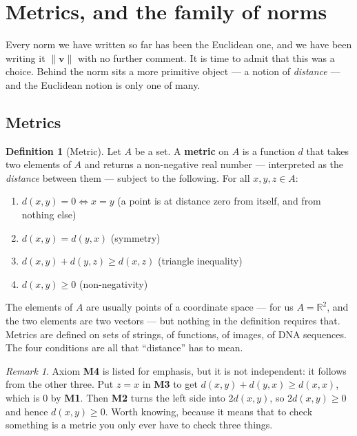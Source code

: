 \documentclass[11pt]{article}
\theoremstyle{definition}
\newtheorem{defn}{Definition}
\theoremstyle{remark}
\newtheorem*{rmk}{Remark}
\newcommand{\R}{\mathbb{R}}
\newcommand{\vc}[1]{\mathbf{#1}}
\newcommand{\norm}[1]{\lVert #1\rVert}
\begin{document}
\section{Metrics, and the family of norms}
Every norm we have written so far has been the Euclidean one, and we have been
writing it $\norm{\vc{v}}$ with no further comment. It is time to admit that
this was a choice. Behind the norm sits a more primitive object --- a notion of
\emph{distance} --- and the Euclidean notion is only one of many.

\subsection{Metrics}
\begin{defn}[Metric]
Let $A$ be a set. A \textbf{metric} on $A$ is a function $d$ that takes two
elements of $A$ and returns a non-negative real number --- interpreted as the
\emph{distance} between them --- subject to the following. For all
$x,y,z\in A$:
\begin{enumerate}[label=\textbf{M\arabic*.},leftmargin=3.0em,itemsep=4pt,
                  topsep=4pt]
  \item $d(x,y)=0 \iff x=y$
        \hfill (a point is at distance zero from itself, and from nothing else)
  \item $d(x,y)=d(y,x)$
        \hfill (symmetry)
  \item $d(x,y)+d(y,z)\ge d(x,z)$
        \hfill (triangle inequality)
  \item $d(x,y)\ge 0$
        \hfill (non-negativity)
\end{enumerate}
\end{defn}

\noindent The elements of $A$ are usually points of a coordinate space --- for
us $A=\R^{2}$, and the two elements are two vectors --- but nothing in the
definition requires that. Metrics are defined on sets of strings, of functions,
of images, of DNA sequences. The four conditions are all that ``distance'' has
to mean.

\begin{rmk}
Axiom \textbf{M4} is listed for emphasis, but it is not independent: it follows
from the other three. Put $z=x$ in \textbf{M3} to get
$d(x,y)+d(y,x)\ge d(x,x)$, which is $0$ by \textbf{M1}. Then \textbf{M2} turns
the left side into $2d(x,y)$, so $2d(x,y)\ge 0$ and hence $d(x,y)\ge 0$. Worth
knowing, because it means that to check something is a metric you only ever have
to check three things.
\end{rmk}
\end{document}
